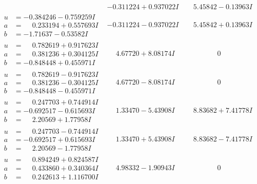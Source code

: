 \documentclass[1p]{elsarticle_modified}
\theoremstyle{definition}
\begin{document}
$$\begin{array}{c|c|c}
 & -0.311224 + 0.937022 I & \phantom{-}5.45842 - 0.13963 I \\ \hline\begin{aligned}
u &= -0.384246 - 0.759259 I \\
a &= \phantom{-}0.233194 + 0.557693 I \\
b &= -1.71637 - 0.53582 I\end{aligned}
 & -0.311224 - 0.937022 I & \phantom{-}5.45842 + 0.13963 I \\ \hline\begin{aligned}
u &= \phantom{-}0.782619 + 0.917623 I \\
a &= \phantom{-}0.381236 + 0.304125 I \\
b &= -0.848448 + 0.455971 I\end{aligned}
 & \phantom{-}4.67720 + 8.08174 I & \phantom{-0.000000 } 0 \\ \hline\begin{aligned}
u &= \phantom{-}0.782619 - 0.917623 I \\
a &= \phantom{-}0.381236 - 0.304125 I \\
b &= -0.848448 - 0.455971 I\end{aligned}
 & \phantom{-}4.67720 - 8.08174 I & \phantom{-0.000000 } 0 \\ \hline\begin{aligned}
u &= \phantom{-}0.247703 + 0.744914 I \\
a &= -0.692517 - 0.615693 I \\
b &= \phantom{-}2.20569 + 1.77958 I\end{aligned}
 & \phantom{-}1.33470 - 5.43908 I & \phantom{-}8.83682 + 7.41778 I \\ \hline\begin{aligned}
u &= \phantom{-}0.247703 - 0.744914 I \\
a &= -0.692517 + 0.615693 I \\
b &= \phantom{-}2.20569 - 1.77958 I\end{aligned}
 & \phantom{-}1.33470 + 5.43908 I & \phantom{-}8.83682 - 7.41778 I \\ \hline\begin{aligned}
u &= \phantom{-}0.894249 + 0.824587 I \\
a &= \phantom{-}0.433860 + 0.340364 I \\
b &= \phantom{-}0.242613 + 1.116700 I\end{aligned}
 & \phantom{-}4.98332 - 1.90943 I & \phantom{-0.000000 } 0 \\ \hline\begin{aligned}

\end{aligned}
\end{array}$$
\end{document}

